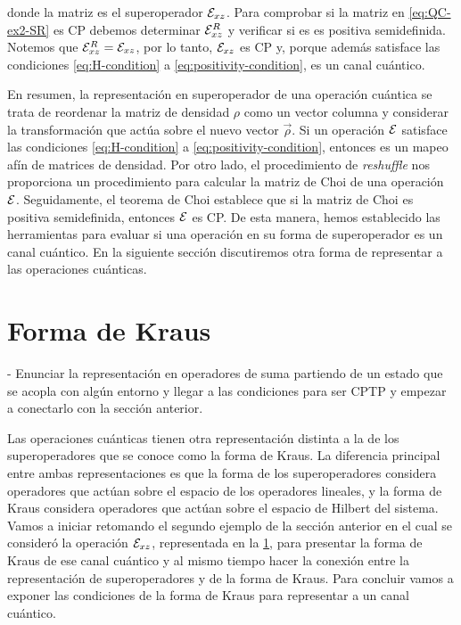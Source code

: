 donde la matriz es el superoperador $\mathcal{E}_{xz}$. 
Para comprobar si la matriz en \eqref{eq:QC-ex2-SR} es CP debemos 
determinar $\mathcal{E}_{xz}^R$ y verificar si es
es positiva semidefinida. Notemos que $\mathcal{E}_{xz}^R=\mathcal{E}_{xz}$, por lo tanto, 
$\mathcal{E}_{xz}$ es CP y, porque además satisface las condiciones
\eqref{eq:H-condition} a \eqref{eq:positivity-condition}, es un canal cuántico.

En resumen, la representación en superoperador de una operación cuántica
se trata de reordenar la matriz de densidad $\rho$ como 
un vector columna y considerar la transformación que actúa sobre el nuevo
vector $\vec{\rho}$. Si un operación $\mathcal{E}$ satisface las condiciones
\eqref{eq:H-condition} a \eqref{eq:positivity-condition}, entonces
es un mapeo afín de matrices de densidad.
Por otro lado, el procedimiento de \textit{reshuffle} 
nos proporciona un procedimiento para calcular la matriz de Choi de una 
operación $\mathcal{E}$. Seguidamente, el teorema de Choi establece que si 
la matriz de Choi es positiva semidefinida, entonces $\mathcal{E}$ es CP. 
De esta manera, hemos establecido las herramientas para evaluar 
si una operación en su forma de superoperador es un canal cuántico.
En la siguiente sección discutiremos otra forma de representar a las operaciones
cuánticas.

\section{Forma de Kraus}
- Enunciar la representación en operadores de suma partiendo de un 
estado que se acopla con algún entorno
y llegar a las condiciones para ser CPTP y empezar a conectarlo
con la sección anterior. 

Las operaciones cuánticas tienen otra representación distinta a la de 
los superoperadores que se conoce como la forma de Kraus. La diferencia
principal entre ambas representaciones es que la forma de los superoperadores
considera operadores que actúan sobre el espacio de los operadores lineales, y
la forma de Kraus considera operadores que actúan sobre el espacio de 
Hilbert del sistema. Vamos a iniciar retomando el segundo ejemplo de la sección 
anterior en el cual se consideró la operación $\mathcal{E}_{xz}$, representada
en la \ref{}, para presentar la forma de Kraus de ese canal cuántico y 
al mismo tiempo hacer la conexión entre la representación de superoperadores
y de la forma de Kraus. Para concluir vamos a exponer las condiciones 
de la forma de Kraus para representar a un canal cuántico.

